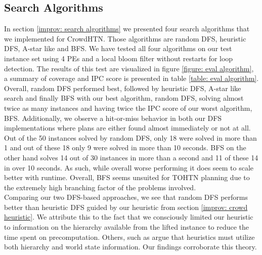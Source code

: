 \subsection{Search Algorithms}
\label{eval: algorithms}
In section \ref{improv: search algorithms} we presented four search algorithms that we implemented for CrowdHTN. Those algorithms are random DFS, heuristic DFS, A-star like and BFS. We have tested all four algorithms on our test instance set using 4 PEs and a local bloom filter without restarts for loop detection. The results of this test are visualized in figure \ref{figure: eval algorithm}, a summary of coverage and IPC score is presented in table \ref{table: eval algorithm}. \\
Overall, random DFS performed best, followed by heuristic DFS, A-star like search and finally BFS with our best algorithm, random DFS, solving almost twice as many instances and having twice the IPC score of our worst algorithm, BFS. Additionally, we observe a hit-or-miss behavior in both our DFS implementations where plans are either found almost immediately or not at all. Out of the 50 instances solved by random DFS, only 18 were solved in more than 1 and out of these 18 only 9 were solved in more than 10 seconds. BFS on the other hand solves 14 out of 30 instances in more than a second and 11 of these 14 in over 10 seconds. As such, while overall worse performing it does seem to scale better with runtime. Overall, BFS seems unsuited for TOHTN planning due to the extremely high branching factor of the problems involved.
\\
Comparing our two DFS-based approaches, we see that random DFS performs better than heuristic DFS guided by our heuristic from section \ref{improv: crowd heuristic}. We attribute this to the fact that we consciously limited our heuristic to information on the hierarchy available from the lifted instance to reduce the time spent on precomputation. Others, such as \cite{holler2020htn} argue that heuristics must utilize both hierarchy and world state information. Our findings corroborate this theory.

